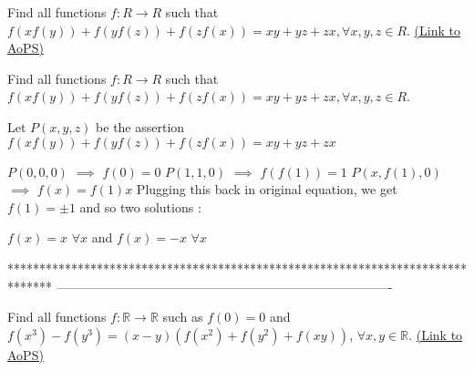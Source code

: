 \begin{problem}
	Find all functions $f:R \to R$ such that $f\left( {xf\left( y \right)} \right) + f\left( {yf\left( z \right)} \right) + f\left( {zf\left( x \right)} \right) = xy + yz + zx,   \forall x,y,z \in R $.
	\flushright \href{https://artofproblemsolving.com/community/c6h565806}{(Link to AoPS)}
\end{problem}



\begin{solution}
	\begin{tcolorbox}Find all functions $f:R \to R$ such that $f\left( {xf\left( y \right)} \right) + f\left( {yf\left( z \right)} \right) + f\left( {zf\left( x \right)} \right) = xy + yz + zx,   \forall x,y,z \in R $.\end{tcolorbox}
Let $P(x,y,z)$ be the assertion $f(xf(y))+f(yf(z))+f(zf(x))=xy+yz+zx$

$P(0,0,0)$ $\implies$ $f(0)=0$
$P(1,1,0)$ $\implies$ $f(f(1))=1$
$P(x,f(1),0)$ $\implies$ $f(x)=f(1)x$
Plugging this back in original equation, we get $f(1)=\pm 1$ and so two solutions :

$\boxed{f(x)=x}$ $\forall x$ and $\boxed{f(x)=-x}$ $\forall x$
\end{solution}
*******************************************************************************
-------------------------------------------------------------------------------

\begin{problem}
	Find all functions $f:\mathbb{R}\to \mathbb{R}$ such as $f(0)=0$ and $f\left( {{x}^{3}} \right)-f\left( {{y}^{3}} \right)=\left( x-y \right)\left( f\left( {{x}^{2}} \right)+f\left( {{y}^{2}} \right)+f\left( xy \right) \right)$, $\forall x,y\in \mathbb{R}$.
	\flushright \href{https://artofproblemsolving.com/community/c6h565811}{(Link to AoPS)}
\end{problem}



